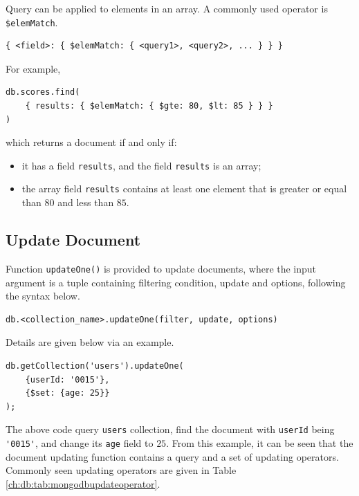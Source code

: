 Query can be applied to elements in an array. A commonly used operator is \verb|$elemMatch|.
\begin{lstlisting}
{ <field>: { $elemMatch: { <query1>, <query2>, ... } } }
\end{lstlisting}
For example,
\begin{lstlisting}
db.scores.find(
	{ results: { $elemMatch: { $gte: 80, $lt: 85 } } }
)
\end{lstlisting}
which returns a document if and only if: 
\begin{itemize}
	\item it has a field \verb|results|, and the field \verb|results| is an array;
	\item the array field \verb|results| contains at least one element that is greater or equal than $80$ and less than $85$.
\end{itemize}

\subsection{Update Document}

Function \verb|updateOne()| is provided to update documents, where the input argument is a tuple containing filtering condition, update and options, following the syntax below.
\begin{lstlisting}
db.<collection_name>.updateOne(filter, update, options)
\end{lstlisting}
Details are given below via an example.
\begin{lstlisting}
db.getCollection('users').updateOne(
	{userId: '0015'},
	{$set: {age: 25}}
);
\end{lstlisting}
The above code query \verb|users| collection, find the document with \verb|userId| being \verb|'0015'|, and change its \verb|age| field to $25$. From this example, it can be seen that the document updating function contains a query and a set of updating operators. Commonly seen updating operators are given in Table \ref{ch:db:tab:mongodbupdateoperator}.

